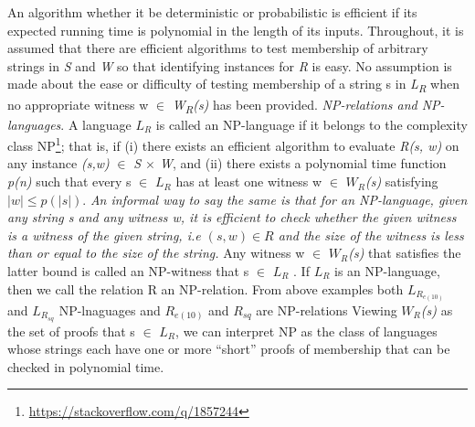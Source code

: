 \documentclass[a4paper]{article}
\newcommand{\quotes}[1]{``#1''}
\begin{document}
\newline
An algorithm whether it be deterministic or probabilistic is efficient if its expected running time is polynomial in the length of its inputs.
\newline
Throughout, it is assumed that there are efficient algorithms to test membership of arbitrary strings in \textit{S} and \textit{W} so that identifying instances for \textit{R} is easy. 
\newline
No assumption is made about the ease or difficulty of testing membership of a string s in \textit{L\textsubscript{R}} when no appropriate witness w $\in$ \textit{W\textsubscript{R}(s)} has been provided.
\newline
\newline
\textit{NP-relations and NP-languages}. A language \textit{$L_R$} is called an NP-language if it belongs to the complexity class NP\footnote{\url{https://stackoverflow.com/q/1857244}}; that is, if (i) there exists an efficient algorithm to evaluate \textit{R(s, w)} on any instance \textit{(s,w)} $\in$ \textit{S $\times$ W}, and (ii) there exists a polynomial time function \emph{p(n)} such that every s $\in$ \textit{$L_R$} has at least one witness w $\in$ \textit{$W_R$(s)} satisfying $|w|\leq p(|s|)$. \textit{An informal way to say the same is that for an NP-language, given any string s and any witness w, it is efficient to check whether the given witness is a witness of the given string, i.e $ (s,w) \in R$ and the size of the witness is less than or equal to the size of the string.} 
Any witness w $\in$ \textit{$W_R$(s)} that satisfies the latter bound is called an NP-witness that s $\in$ \textit{$L_R$} . If \textit{$L_R$} is an NP-language, then we call the relation R an NP-relation. From above examples both \textit{$L_{R_{e(10)}}$} and \textit{$L_{R_{sq}}$} NP-lnaguages and \textit{$R_{e(10)}$} and \textit{$R_{sq}$} are NP-relations
Viewing \textit{$W_R$(s)} as the set of proofs that s $\in$ \textit{$L_R$}, we can interpret NP as the class of languages whose strings each have one or more \quotes{short} proofs of membership that can be checked in polynomial time.
\end{document}
